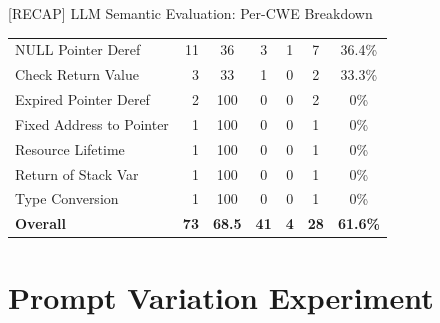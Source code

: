 \documentclass[aspectratio=169,10pt]{beamer}
\newcommand{\chit}[1]{\cellcolor{hit!30} #1}
\newcommand{\cmiss}[1]{\cellcolor{miss!25} #1}
\newcommand{\cwarn}[1]{\cellcolor{warn!30} #1}
\begin{document}
\begin{frame}{[RECAP] LLM Semantic Evaluation: Per-CWE Breakdown}
{\begin{tabular}{l r c c c c c}
    NULL Pointer Deref         & 11 & \cmiss{36}  & 3 & 1 & 7 & \cmiss{36.4\%} \\
    \rowcolor{miss!8}
    Check Return Value         & 3  & \cwarn{33}  & 1 & 0 & 2 & \cmiss{33.3\%} \\
    \rowcolor{miss!8}
    Expired Pointer Deref      & 2  & \chit{100}  & 0 & 0 & 2 & \cmiss{0\%} \\
    \rowcolor{miss!8}
    Fixed Address to Pointer   & 1  & \chit{100}  & 0 & 0 & 1 & \cmiss{0\%} \\
    \rowcolor{miss!8}
    Resource Lifetime          & 1  & \chit{100}  & 0 & 0 & 1 & \cmiss{0\%} \\
    \rowcolor{miss!8}
    Return of Stack Var        & 1  & \chit{100}  & 0 & 0 & 1 & \cmiss{0\%} \\
    \rowcolor{miss!8}
    Type Conversion            & 1  & \chit{100}  & 0 & 0 & 1 & \cmiss{0\%} \\
    \midrule
    \rowcolor{c1!8}
    \textbf{Overall}           & \textbf{73} & \textbf{68.5} & \textbf{41} & \textbf{4} & \textbf{28} & \textbf{61.6\%} \\
    \bottomrule
  \end{tabular}}

\end{frame}
\section{Prompt Variation Experiment}
\end{document}
